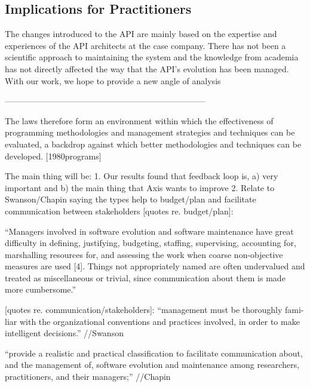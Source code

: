 \documentclass{sig-alternate}
\begin{document}
\subsection{Implications for Practitioners}
The changes introduced to the API are mainly based on the expertise and experiences of the API architects at the case company. There has not been a scientific approach to maintaining the system and the knowledge from academia has not directly affected the way that the API's evolution has been managed. With our work, we hope to provide a new angle of analysis 


------------------------------------------------------------------------

The laws therefore form an environment within which the effectiveness of programming methodologies and management strategies and techniques can be evaluated, a backdrop against which better methodologies and techniques can be developed. [1980programs]

The main thing will be:
1. Our results found that feedback loop is, a) very important and b) the main thing that Axis wants to improve
2. Relate to Swanson/Chapin saying the types help to budget/plan and facilitate communication between stakeholders
       [quotes re. budget/plan]:

   ``Managers involved in software evolution and software maintenance have great difficulty in
   defining, justifying, budgeting, staffing, supervising, accounting for, marshalling resources
   for, and assessing the work when coarse non-objective measures are used [4]. Things not
   appropriately named are often undervalued and treated as miscellaneous or trivial, since
   communication about them is made more cumbersome.'' %

       [quotes re. communication/stakeholders]:
       ``management must be thoroughly fami-liar with the organizational conventions and practices
       involved, in order to make intelligent decisions.'' //Swanson
       
       ``provide a realistic and practical classification to facilitate communication about, and the
       management of, software evolution and maintenance among researchers, practitioners, and their
       managers;'' //Chapin

\end{document}
